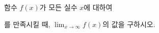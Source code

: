 함수 $f(x)$가 모든 실수 $x$에 대하여\par\smallskip{}\par\smallskip\noindent 를 만족시킬 때, $\displaystyle\lim_{x\to\infty}f(x)$의 값을 구하시오.
